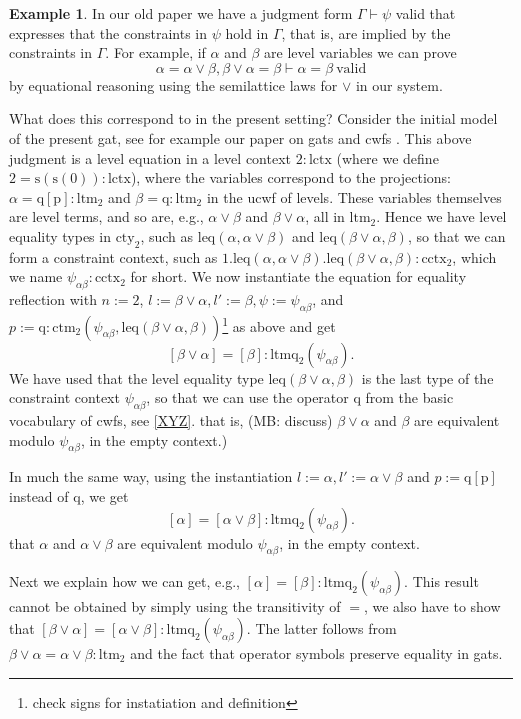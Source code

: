 \documentclass[11pt,a4paper]{article}
\theoremstyle{definition}
\newtheorem{example}{Example}
\def\psiab{\psi_{\alpha\beta}}
\def\lctx{\mathrm{lctx}}
\def\ltm{\mathrm{ltm}}
\def\ltmq{\mathrm{ltmq}}
\def\leq{\mathrm{leq}}
\def\s{\mathrm{s}}
\def\cctx{\mathrm{cctx}}
\def\cty{\mathrm{cty}}
\def\ctm{\mathrm{ctm}}
\def\p{\mathrm{p}}
\def\q{\mathrm{q}}
\begin{document}
\begin{example}\label{exa:cctx-entails-lattice-eqs}
In our old paper we have a judgment form $\Gamma \vdash \psi$ valid that expresses that the constraints in $\psi$
hold in $\Gamma$, that is, are implied by the constraints in $\Gamma$.
For example, if $\alpha$ and $\beta$ are level variables we can prove
$$
\alpha = \alpha\vee\beta, \beta\vee\alpha = \beta \vdash \alpha = \beta\ \mathrm{valid}
$$
by equational reasoning using the semilattice laws for $\vee$ in our system.

What does this correspond to in the present setting? Consider the initial model of the present gat, see for example our paper on gats and cwfs \cite{bezem:hofmann}. This above judgment is a level equation in a level context $2:\lctx$ (where we define $2 = \s(\s(0)) : \lctx$), where the variables correspond to the projections: $\alpha = \q[\p] : \ltm_2$ and $\beta = \q  : \ltm_2$ in the ucwf of levels. These variables themselves are level terms, and so are, 
e.g., $\alpha\vee\beta$ and $\beta\vee\alpha$, all in $\ltm_2$.
Hence we have level equality types in $\cty_2$, such as
$\leq(\alpha,\alpha\vee\beta)$ and $\leq(\beta\vee\alpha,\beta)$,
so that we can form a constraint context, such as 
$1.\leq(\alpha,\alpha\vee\beta).\leq(\beta\vee\alpha,\beta) : \cctx_2$,
which we name $\psiab : \cctx_2$ for short.
We now instantiate the equation for equality reflection
with $n := 2$, $l :=  \beta\vee\alpha, l':= \beta, \psi:= \psiab$, and $p := \q: \ctm_2(\psiab,\leq(\beta\vee\alpha,\beta))$\footnote{check signs for instatiation and definition}
as above and get 
\[
[\beta\vee\alpha] = [\beta] : \ltmq_2(\psiab).
\]
We have used that the
level equality type $\leq(\beta\vee\alpha,\beta)$ is the last type
of the constraint context $\psiab$, so that we can use the operator $\q$ 
from the basic vocabulary of cwfs, see \ref{XYZ}.
that is, (MB: discuss) $\beta\vee\alpha$ and $\beta$ are equivalent
modulo $\psiab$, in the empty context.)

In much the same way, using the instantiation $l := \alpha,
l' := \alpha\vee\beta$ and $p := \q[\p]$ instead of $\q$, we get
\[
[\alpha]=[\alpha\vee\beta] : \ltmq_2(\psiab).
\]
that $\alpha$ and $\alpha\vee\beta$ are equivalent modulo $\psiab$, 
in the empty context.

Next we explain how we can get, e.g.,
$
[\alpha] = [\beta] : \ltmq_2(\psiab).
$
This result cannot be obtained by simply using the transitivity of $=$,
we also have to show that
$
[\beta\vee\alpha]=[\alpha\vee\beta] : \ltmq_2(\psiab).
$
The latter follows from 
$
\beta\vee\alpha=\alpha\vee\beta : \ltm_2$ and the fact that operator symbols preserve equality in gats.
\end{example}
\end{document}
